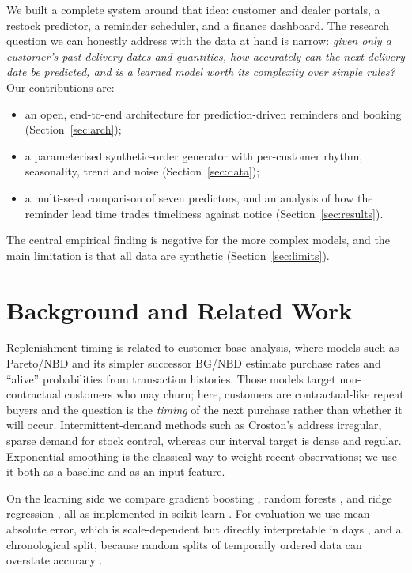 \documentclass[conference]{IEEEtran}
\begin{document}
We built a complete system around that idea: customer and dealer portals, a restock predictor, a reminder scheduler, and a finance dashboard. The research question we can honestly address with the data at hand is narrow: \emph{given only a customer's past delivery dates and quantities, how accurately can the next delivery date be predicted, and is a learned model worth its complexity over simple rules?} Our contributions are:
\begin{itemize}
\item an open, end-to-end architecture for prediction-driven reminders and booking (Section~\ref{sec:arch});
\item a parameterised synthetic-order generator with per-customer rhythm, seasonality, trend and noise (Section~\ref{sec:data});
\item a multi-seed comparison of seven predictors, and an analysis of how the reminder lead time trades timeliness against notice (Section~\ref{sec:results}).
\end{itemize}
The central empirical finding is negative for the more complex models, and the main limitation is that all data are synthetic (Section~\ref{sec:limits}).

\section{Background and Related Work}
Replenishment timing is related to customer-base analysis, where models such as Pareto/NBD \cite{schmittlein1987} and its simpler successor BG/NBD \cite{fader2005} estimate purchase rates and ``alive'' probabilities from transaction histories. Those models target non-contractual customers who may churn; here, customers are contractual-like repeat buyers and the question is the \emph{timing} of the next purchase rather than whether it will occur. Intermittent-demand methods such as Croston's \cite{croston1972} address irregular, sparse demand for stock control, whereas our interval target is dense and regular. Exponential smoothing \cite{brown1959} is the classical way to weight recent observations; we use it both as a baseline and as an input feature.

On the learning side we compare gradient boosting \cite{friedman2001}, random forests \cite{breiman2001}, and ridge regression \cite{hoerl1970}, all as implemented in scikit-learn \cite{pedregosa2011}. For evaluation we use mean absolute error, which is scale-dependent but directly interpretable in days \cite{hyndman2006}, and a chronological split, because random splits of temporally ordered data can overstate accuracy \cite{bergmeir2012}.
\end{document}

